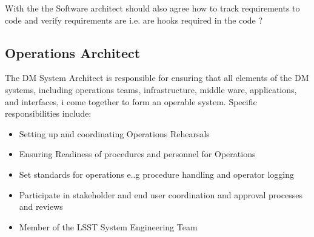 With the  the Software architect should also agree how to track requirements to code and verify requirements are i.e. are hooks required in the code ?
\subsection{Operations Architect \label{role:sysarc }}
The DM System Architect is responsible for ensuring that all elements of the DM systems, including operations teams, infrastructure, middle ware, applications, and interfaces, i
come together to form an operable system. 
Specific responsibilities include:
\begin{itemize}
\item Setting up and coordinating  Operations Rehearsals
\item Ensuring Readiness of procedures and personnel for Operations
\item Set standards for operations e..g procedure handling and operator logging
\item Participate in stakeholder and end user coordination and approval processes and reviews
\item Member of the LSST System Engineering Team
\end{itemize}


